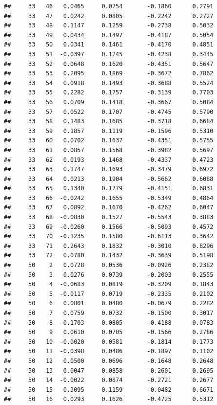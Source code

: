 \documentclass[
]{article}
\begin{document}
\begin{verbatim}
##     33   46   0.0465     0.0754       -0.1860      0.2791  
##     33   47   0.0242     0.0805       -0.2242      0.2727  
##     33   48   0.1147     0.1259       -0.2738      0.5032  
##     33   49   0.0434     0.1497       -0.4187      0.5054  
##     33   50   0.0341     0.1461       -0.4170      0.4851  
##     33   51  -0.0397     0.1245       -0.4238      0.3445  
##     33   52   0.0648     0.1620       -0.4351      0.5647  
##     33   53   0.2095     0.1869       -0.3672      0.7862  
##     33   54   0.0918     0.1493       -0.3688      0.5524  
##     33   55   0.2282     0.1757       -0.3139      0.7703  
##     33   56   0.0709     0.1418       -0.3667      0.5084  
##     33   57   0.0522     0.1707       -0.4745      0.5790  
##     33   58   0.1483     0.1685       -0.3718      0.6684  
##     33   59   0.1857     0.1119       -0.1596      0.5310  
##     33   60   0.0702     0.1637       -0.4351      0.5755  
##     33   61   0.0857     0.1568       -0.3982      0.5697  
##     33   62   0.0193     0.1468       -0.4337      0.4723  
##     33   63   0.1747     0.1693       -0.3479      0.6972  
##     33   64   0.0213     0.1904       -0.5662      0.6088  
##     33   65   0.1340     0.1779       -0.4151      0.6831  
##     33   66  -0.0242     0.1655       -0.5349      0.4864  
##     33   67   0.0892     0.1670       -0.4262      0.6047  
##     33   68  -0.0830     0.1527       -0.5543      0.3883  
##     33   69  -0.0260     0.1566       -0.5093      0.4572  
##     33   70  -0.1235     0.1580       -0.6113      0.3642  
##     33   71   0.2643     0.1832       -0.3010      0.8296  
##     33   72   0.0780     0.1432       -0.3639      0.5198  
##     50    2   0.0728     0.0536       -0.0926      0.2382  
##     50    3   0.0276     0.0739       -0.2003      0.2555  
##     50    4  -0.0683     0.0819       -0.3209      0.1843  
##     50    5  -0.0117     0.0719       -0.2335      0.2102  
##     50    6   0.0801     0.0480       -0.0679      0.2282  
##     50    7   0.0759     0.0732       -0.1500      0.3017  
##     50    8  -0.1703     0.0805       -0.4188      0.0783  
##     50    9   0.0610     0.0705       -0.1566      0.2786  
##     50   10  -0.0020     0.0581       -0.1814      0.1773  
##     50   11  -0.0398     0.0486       -0.1897      0.1102  
##     50   12   0.0500     0.0696       -0.1648      0.2648  
##     50   13   0.0047     0.0858       -0.2601      0.2695  
##     50   14  -0.0022     0.0874       -0.2721      0.2677  
##     50   15   0.3095     0.1159       -0.0482      0.6671  
##     50   16   0.0293     0.1626       -0.4725      0.5312  

\end{verbatim}
\end{document}

